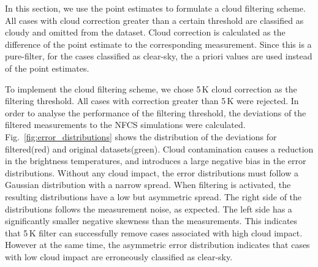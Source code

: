 \documentclass[amt, manuscript]{copernicus}
\begin{document}
In this section, we use the point estimates to formulate a cloud filtering scheme. All cases with  cloud correction greater than a certain threshold are classified as cloudy and omitted from the dataset. Cloud correction is calculated as the difference of the point estimate to the corresponding measurement. Since this is a pure-filter, for the cases classified as clear-sky, the a priori values are used instead of the point estimates. 

To implement the cloud filtering scheme, we chose 5\,K cloud correction as the filtering threshold. All cases with correction greater than 5\,K were rejected. In order to analyse the performance of the filtering threshold, the deviations of the filtered measurements to the NFCS simulations were calculated. Fig.~\ref{fig:error_distributions} shows the distribution of the deviations for filtered(red) and original datasets(green). Cloud contamination causes a reduction in the brightness temperatures, and introduces a large negative bias in the error distributions. Without any cloud impact, the error distributions must follow a Gaussian distribution with a narrow spread. When filtering is activated, the resulting distributions have a low but asymmetric spread. The right side of the distributions follows the measurement noise, as expected. The left side has a significantly smaller negative skewness than the measurements. This indicates that 5\,K filter can successfully remove cases associated with high cloud impact. However at the same time, the asymmetric error distribution indicates that cases with low cloud impact are erroneously classified as clear-sky.
\end{document}
